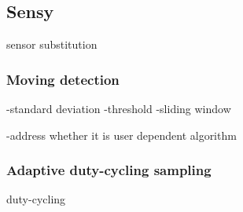 \subsection{Sensy}
\label{s:design:sensy}

sensor substitution

\subsubsection{Moving detection}
-standard deviation
	-threshold
-sliding window

-address whether it is user dependent algorithm

\subsubsection{Adaptive duty-cycling sampling}
duty-cycling
\label{s:design:sensy:adaptive}
